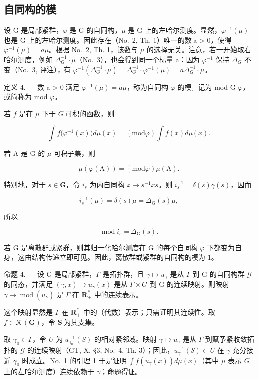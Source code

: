 \subsection{自同构的模}

设 G 是局部紧群，\(\varphi\) 是 G 的自同构，\(\mu\) 是 G 上的左哈尔测度。显然，\(\varphi^{-1}(\mu)\) 也是 G 上的左哈尔测度。因此存在（No.~2, Th. 1）唯一的数 a \textgreater{} 0，使得 \(\varphi^{-1}(\mu) = a\mu\)。根据 No.~2, Th. 1，该数与 \(\mu\) 的选择无关。注意，若一开始取右哈尔测度，例如 \(\Delta_{G}^{-1} \cdot \mu\)（No.~3），也会得到同一个标量 a：因为 \(\varphi^{-1}\) 保持 \(\Delta_{G}\) 不变（No.~3, 评注），有 \(\varphi^{-1}(\Delta_{G}^{-1} \cdot \mu) = \Delta_{G}^{-1} \cdot \varphi^{-1}(\mu) = a\Delta_{G}^{-1} \cdot \mu\)。

定义 4. --- 数 a \textgreater{} 0 满足 \(\varphi^{-1}(\mu) = a\mu\)，称为自同构 \(\varphi\) 的模，记为 mod G \(\varphi\)，或简称为 mod \(\varphi\)。

若 \(f\) 是在 \(\mu\) 下于 \(G\) 可积的函数，则

\[
\int f \big (\varphi^ {- 1} (x) \big) d \mu (x) = (\mathrm{mod} \varphi) \int f (x) d \mu (x).\tag{31}
\]

若 A 是 G 的 \(\mu\)-可积子集，则

\[
\mu (\varphi (\mathrm{A})) = (\mathrm{mod} \varphi) \mu (\mathrm{A}).\tag{32}
\]

特别地，对于 \(s \in \mathbf{G}\)，令 \(i_s\) 为内自同构 \(x \mapsto s^{-1}xs\)。则 \(i_s^{-1} = \delta(s)\gamma(s)\)，因而

\[
i _ {s} ^ {- 1} (\mu) = \delta (s) \mu = \Delta_ {\mathrm{G}} (s) \mu ,
\]

所以

\[
\operatorname{mod} i _ {s} = \Delta_ {\mathrm{G}} (s).\tag{33}
\]

若 G 是离散群或紧群，则其归一化哈尔测度在 G 的每个自同构 \(\varphi\) 下都变为自身，这由结构传递立即可见。因此，离散群或紧群的自同构的模为 1。

命题 4. --- 设 G 是局部紧群，\(\Gamma\) 是拓扑群，且 \(\gamma \mapsto u_{\gamma}\) 是从 \(\Gamma\) 到 G 的自同构群 \(\mathcal{G}\) 的同态，并满足 \((\gamma, x) \mapsto u_{\gamma}(x)\) 是从 \(\Gamma \times G\) 到 G 的连续映射。则映射 \(\gamma \mapsto \operatorname{mod}(u_{\gamma})\) 是 \(\Gamma\) 在 \(\mathbf{R}_{+}^{*}\) 中的连续表示。

这个映射显然是 \(\Gamma\) 在 \(\mathbf{R}_+^*\) 中的（代数）表示；只需证明其连续性。取 \(f \in \mathcal{K}(\mathbf{G})\)，令 \(\mathbf{S}\) 为其支集。

取 \(\gamma_0 \in \Gamma\)，令 \(U\) 为 \(u_{\gamma_0}^{-1}(S)\) 的相对紧邻域。映射 \(\gamma \mapsto u_\gamma\) 是从 \(\Gamma\) 到赋予紧收敛拓扑的 \(\mathcal{G}\) 的连续映射（GT, X, §3, No.~4, Th. 3）；因此，\(u_{\gamma}^{-1}(S) \subset U\) 在 \(\gamma\) 充分接近 \(\gamma_0\) 时成立。No.~1 的引理 1 于是证明 \(\int f(u_\gamma(x)) d\mu(x)\)（其中 \(\mu\) 表示 \(G\) 上的左哈尔测度）连续依赖于 \(\gamma\)；命题得证。

